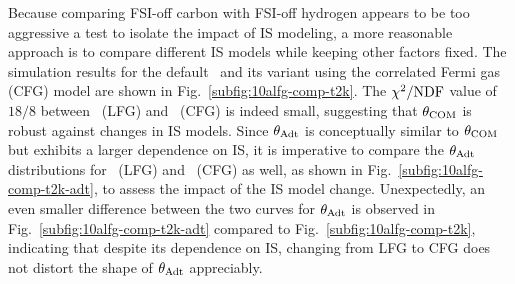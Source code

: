      Because comparing FSI-off carbon with FSI-off hydrogen appears to be too aggressive a test to isolate the impact of IS modeling, a more reasonable approach is to compare different IS models while keeping other factors fixed.
     The simulation results for the default \geta\ and its variant using the correlated Fermi gas (CFG) model are shown in Fig.~\ref{subfig:10alfg-comp-t2k}.
     The $\chi^2/{\textrm{NDF}}$ value of $18/8$ between \geta\ (LFG) and \geta\ (CFG) is indeed small, suggesting that $\theta_{\textrm{COM}}$ is robust against changes in IS models.
     Since $\theta_{\textrm{Adt}}$ is conceptually similar to $\theta_{\textrm{COM}}$ but exhibits a larger dependence on IS, it is imperative to compare the $\theta_{\textrm{Adt}}$ distributions for \geta\ (LFG) and \geta\ (CFG) as well, as shown in Fig.~\ref{subfig:10alfg-comp-t2k-adt}, to assess the impact of the IS model change.
     Unexpectedly, an even smaller difference between the two curves for $\theta_{\textrm{Adt}}$ is observed in Fig.~\ref{subfig:10alfg-comp-t2k-adt} compared to Fig.~\ref{subfig:10alfg-comp-t2k}, indicating that despite its dependence on IS, changing from LFG to CFG does not distort the shape of $\theta_{\textrm{Adt}}$ appreciably.
